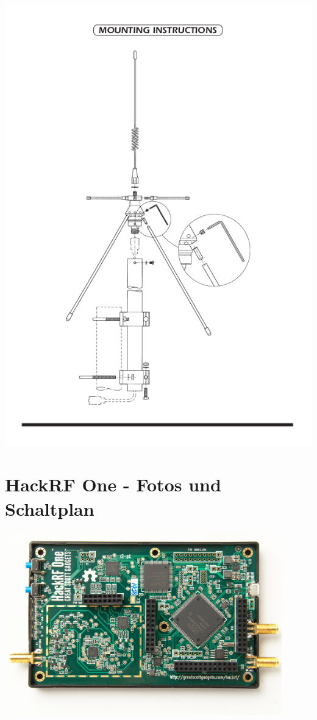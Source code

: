 \includegraphics[width=\textwidth]{content/appendix/sd3000-3.png}


\chapter{HackRF One - Fotos und Schaltplan}
\includegraphics[angle=270,width=0.9\textwidth]{content/appendix/HackRF-One-fd0-0009.jpeg}

\newpage

 

